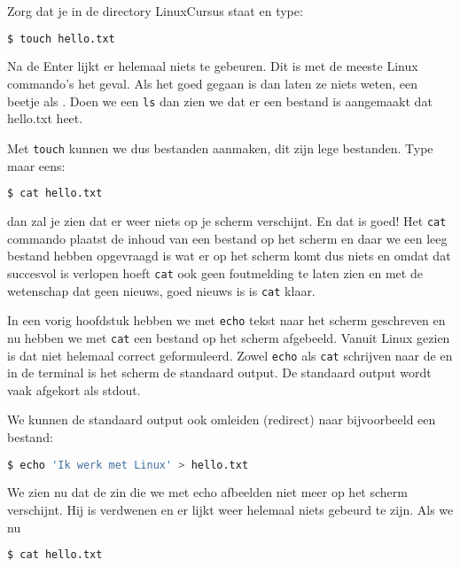 Zorg dat je in de directory LinuxCursus staat en type:

\begin{lstlisting}[language=bash]
$ touch hello.txt
\end{lstlisting}

Na de Enter lijkt er helemaal niets te gebeuren. Dit is met de meeste Linux commando's het geval. Als het goed gegaan is dan laten ze niets weten, een beetje als . Doen we een \texttt{ls} dan zien we dat er een bestand is aangemaakt dat hello.txt heet.

Met \texttt{touch} kunnen we dus bestanden aanmaken, dit zijn lege bestanden. Type maar eens:

\begin{lstlisting}[language=bash]
$ cat hello.txt
\end{lstlisting}

dan zal je zien dat er weer niets op je scherm verschijnt. En dat is goed! Het \texttt{cat} commando plaatst de inhoud van een bestand op het scherm en daar we een leeg bestand hebben opgevraagd is wat er op het scherm komt dus niets en omdat dat succesvol is verlopen hoeft \texttt{cat} ook geen foutmelding te laten zien en met de wetenschap dat geen nieuws, goed nieuws is is \texttt{cat} klaar.

In een vorig hoofdstuk hebben we met \texttt{echo} tekst naar het scherm geschreven en nu hebben we met \texttt{cat} een bestand op het scherm afgebeeld. Vanuit Linux gezien is dat niet helemaal correct geformuleerd. Zowel \texttt{echo} als \texttt{cat} schrijven naar de  en in de terminal is het scherm de standaard output. De standaard output wordt vaak afgekort als stdout.

We kunnen de standaard output ook omleiden (redirect) naar bijvoorbeeld een bestand:

\begin{lstlisting}[language=bash]
$ echo 'Ik werk met Linux' > hello.txt
\end{lstlisting}

We zien nu dat de zin die we met echo afbeelden niet meer op het scherm verschijnt. Hij is verdwenen en er lijkt weer helemaal niets gebeurd te zijn. Als we nu

\begin{lstlisting}[language=bash]
$ cat hello.txt
\end{lstlisting}

